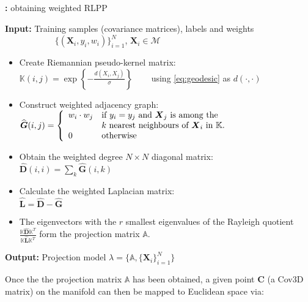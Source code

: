 \documentclass[10pt,twocolumn,letterpaper]{article}
\newcommand{\eqsize}{\footnotesize}
\newcommand{\cov}{{Cov3D}}
\newcommand{\mat}[1]{{\boldsymbol{#1}}}
\begin{document}
\begin{algorithm}
  \footnotesize
  \raggedright
  \caption{{\bf :} {\footnotesize obtaining weighted RLPP}}
  \label{alg:wrlpp}
  
  \textbf{Input:} Training samples (covariance matrices), labels and weights\\
                  ~~~~~~~~~~~ $\{(\mat{X}_i,y_i,w_i)\}_{i=1}^{N}$, $\mat{X}_i\in\mathcal{M}$\\
  
  \begin{itemize} \leftskip-1em
    \item
      Create Riemannian pseudo-kernel matrix:\\
      $\mathbb{K}(i,j) = \exp \left\{-\frac{d(X_i,X_j)}{\sigma} \right\}$ ~~~ using \eqref{eq:geodesic} as $d(\cdot,\cdot)$
               
    \item
      Construct weighted adjacency graph:\\
      $\widehat{\mat{G}}(i,j) = \left\{ \begin{array}{l l}
                                   w_i \cdot w_j & \text{if} ~ y_i = y_j ~ \text{and} ~ \mat{X}_j ~ \text{is among the}\\
                                                 & k ~ \text{nearest neighbours of} ~ \mat{X}_i ~ \text{in} ~ \mathbb{K}.\\
                                   0             & \text{otherwise}
                                 \end{array} \right.$
    \item Obtain the weighted degree $N \times N$ diagonal matrix:\\
               $\widehat{\mat{D}}(i,i) = \sum_k \widehat{\mat{G}}(i,k)$
    \item Calculate the weighted Laplacian matrix:\\
          $\widehat{\mat{L}} = \widehat{\mat{D}} - \widehat{\mat{G}}$
    \item The eigenvectors with the $r$ smallest eigenvalues of the Rayleigh quotient $\frac{\mathbb{K} \widehat{\mat{D}} \mathbb{K}^T}{\mathbb{K}
          \widehat{\mat{L}} \mathbb{K}^T}$ form the projection matrix $\mathbb{A}$.
  \end{itemize}
  
  \textbf{Output:} Projection model $\lambda = \{\mathbb{A}, \{\mat{X}_i\}_{i=1}^{N}\}$
\end{algorithm}

Once the the projection matrix {\eqsize $\mathbb{A}$} has been obtained,
a given point {\eqsize $\mat{C}$} (a {\cov} matrix) on the manifold can then be mapped to Euclidean space via:
\end{document}

